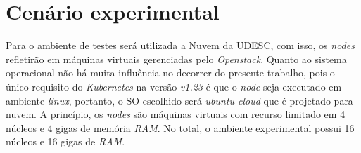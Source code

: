

\section{Cenário experimental}
Para o ambiente de testes será utilizada a Nuvem da UDESC, com isso, os \textit{nodes} refletirão em máquinas virtuais gerenciadas pelo \textit{Openstack}. Quanto ao sistema operacional não há muita influência no decorrer do presente trabalho, pois o único requisito do \textit{Kubernetes} na versão \textit{v1.23} é que o \textit{node} seja executado em ambiente \textit{linux}, portanto, o \ac{SO} escolhido será \textit{ubuntu cloud} que é projetado para nuvem. A princípio, os \textit{nodes} são máquinas virtuais com recurso limitado em 4 núcleos e 4 gigas de memória \textit{RAM}. No total, o ambiente experimental possui 16 núcleos e 16 gigas de \textit{RAM}.

